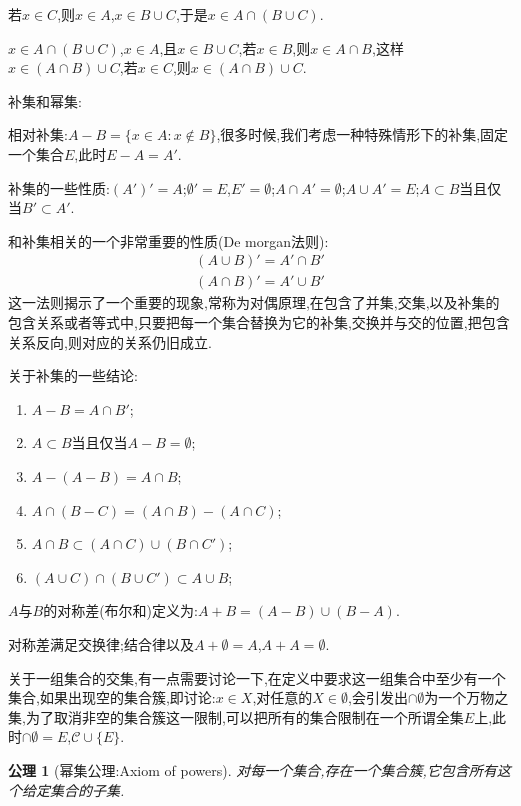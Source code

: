 \documentclass[12pt,a4paper,openany]{book}
\newtheorem{axiom}{公理}[section]
\begin{document}
若$x \in C$,则$x \in A$,$x \in B \cup C$,于是$x \in A \cap (B \cup C)$.

$x \in A \cap (B \cup C)$,$x \in A$,且$x \in B \cup C$,若$x \in B$,则$x \in A \cap B$,这样$x \in (A \cap B) \cup C$,若$x \in C$,则$x \in (A \cap B) \cup C$.

补集和幂集:

相对补集:$A - B = \{x \in A: x \notin B\}$,很多时候,我们考虑一种特殊情形下的补集,固定一个集合$E$,此时$E-A=A'$.

补集的一些性质:$(A')'=A$;$\emptyset'=E$,$E'=\emptyset$;$A \cap A'=\emptyset$;$A \cup A'=E$;$A \subset B$当且仅当$B' \subset A'$.

和补集相关的一个非常重要的性质(De morgan法则):
\begin{gather*}
(A \cup B)' = A' \cap B' \\
(A \cap B)' = A' \cup B'
\end{gather*}
这一法则揭示了一个重要的现象,常称为对偶原理,在包含了并集,交集,以及补集的包含关系或者等式中,只要把每一个集合替换为它的补集,交换并与交的位置,把包含关系反向,则对应的关系仍旧成立.

关于补集的一些结论:
\begin{enumerate}
\item $A - B = A \cap B'$;
\item $A \subset B$当且仅当$A - B = \emptyset$;
\item $A - (A - B) = A \cap B$;
\item $A \cap (B - C) = (A \cap B) - (A \cap C)$;
\item $A \cap B \subset (A \cap C) \cup (B \cap C')$;
\item $(A \cup C) \cap (B \cup C') \subset A \cup B$;
\end{enumerate}

$A$与$B$的对称差(布尔和)定义为:$A + B = (A-B) \cup (B-A)$.

对称差满足交换律;结合律以及$A + \emptyset = A$,$A + A = \emptyset$.

关于一组集合的交集,有一点需要讨论一下,在定义中要求这一组集合中至少有一个集合,如果出现空的集合簇,即讨论:$x \in X$,对任意的$X \in \emptyset$,会引发出$\cap{\emptyset}$为一个万物之集,为了取消非空的集合簇这一限制,可以把所有的集合限制在一个所谓全集$E$上,此时$\cap{\emptyset}=E$,$\mathscr{C} \cup \{E\}$.

\begin{axiom}[幂集公理:Axiom of powers]
对每一个集合,存在一个集合簇,它包含所有这个给定集合的子集.
\end{axiom}
\end{document}
